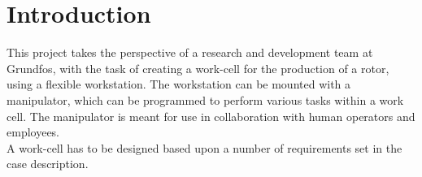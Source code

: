 \chapter{Introduction} \label{ch:introduction}

This project takes the perspective of a research and development team at Grundfos, with the task of creating a work-cell for the production of a rotor, using a flexible workstation. The workstation can be mounted with a manipulator, which can be programmed to perform various tasks within a work cell. The manipulator is meant for use in collaboration with human operators and employees.\\ 
A work-cell has to be designed based upon a number of requirements set in the case description.\\


